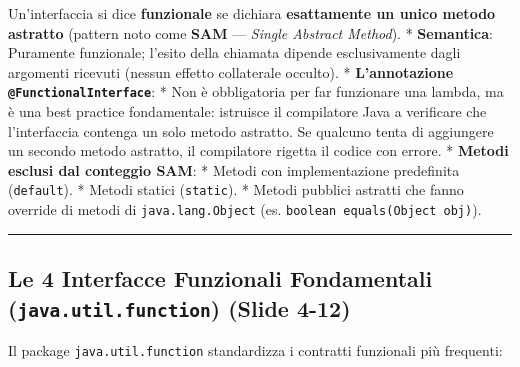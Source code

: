 \documentclass[11pt,a4paper,oneside]{report}
\newcommand{\passthrough}[1]{#1}
\begin{document}
Un'interfaccia si dice \textbf{funzionale} se dichiara
\textbf{esattamente un unico metodo astratto} (pattern noto come
\textbf{SAM} --- \emph{Single Abstract Method}). * \textbf{Semantica}:
Puramente funzionale; l'esito della chiamata dipende esclusivamente
dagli argomenti ricevuti (nessun effetto collaterale occulto). *
\textbf{L'annotazione \passthrough{\lstinline!@FunctionalInterface!}}: *
Non è obbligatoria per far funzionare una lambda, ma è una best practice
fondamentale: istruisce il compilatore Java a verificare che
l'interfaccia contenga un solo metodo astratto. Se qualcuno tenta di
aggiungere un secondo metodo astratto, il compilatore rigetta il codice
con errore. * \textbf{Metodi esclusi dal conteggio SAM}: * Metodi con
implementazione predefinita (\passthrough{\lstinline!default!}). *
Metodi statici (\passthrough{\lstinline!static!}). * Metodi pubblici
astratti che fanno override di metodi di
\passthrough{\lstinline!java.lang.Object!} (es.
\passthrough{\lstinline!boolean equals(Object obj)!}).

\begin{center}\rule{0.5\linewidth}{0.5pt}\end{center}

\subsection{\texorpdfstring{Le 4 Interfacce Funzionali Fondamentali
(\texttt{java.util.function}) (Slide
4-12)}{Le 4 Interfacce Funzionali Fondamentali (java.util.function) (Slide 4-12)}}\label{chap17_le-4-interfacce-funzionali-fondamentali-java.util.function-slide-4-12}

Il package \passthrough{\lstinline!java.util.function!} standardizza i
contratti funzionali più frequenti:
\end{document}
